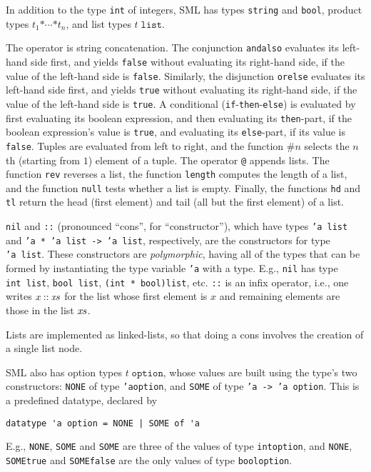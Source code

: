In addition to the type \texttt{int} of integers,
%
%
SML has types \texttt{string} and \texttt{bool}, product types
$t_1\mathbin{\mathtt{*}}\cdots\mathbin{\mathtt{*}}t_n$, and list types
$t\;\mathtt{list}$.  %
%
%
%
%
%
%

The operator \texttt{\uparrowsym} is string
concatenation.  The conjunction \texttt{andalso} evaluates its
left-hand side first, and yields \texttt{false} without evaluating its
right-hand side, if the value of the left-hand side is \texttt{false}.
Similarly, the disjunction \texttt{orelse} evaluates its left-hand
side first, and yields \texttt{true} without evaluating its right-hand
side, if the value of the left-hand side is \texttt{true}.  A
conditional (\texttt{if}-\texttt{then}-\texttt{else}) is evaluated by
first evaluating its boolean expression, and then evaluating its
\texttt{then}-part, if the boolean expression's value is
\texttt{true}, and evaluating its \texttt{else}-part, if its value is
\texttt{false}.  Tuples are evaluated from left to right, and the
function $\texttt{\#}n$ selects the $n$th (starting from $1$) element
of a tuple. The operator \texttt{@} appends lists.   The function
\texttt{rev} reverses a list, the function \texttt{length} computes
the length of a list, and the function \texttt{null} tests
whether a list is empty.  Finally, the functions \texttt{hd} and
\texttt{tl} return the head (first element) and tail (all but the
first element) of a list.

\texttt{nil} and \texttt{::} (pronounced ``cons'', for
``constructor''), which have types \texttt{'a~list} and
\texttt{'a~*~'a~list~->~'a~list}, respectively, are the constructors
for type \texttt{'a~list}.
These constructors are \emph{polymorphic}, having all of the types
that can be formed by instantiating the type variable \texttt{'a} with
a type.  E.g., \texttt{nil} has type \texttt{int~list}, \texttt{bool~list},
\texttt{(int~*~bool)list}, etc.  \texttt{::} is an infix operator,
i.e., one writes $x\mathbin{\mathtt{::}}{\it xs}$ for the list whose
first element is $x$ and remaining elements are those in the list
${\it xs}$.

Lists are implemented as linked-lists, so that doing a cons involves
the creation of a single list node.

SML also has option types $t\;\mathtt{option}$, whose values are
%
built using the type's two constructors: \texttt{NONE}
%
of type \texttt{'a\;option}, and \texttt{SOME}
%
of type \texttt{'a~->~'a~option}.  This is a predefined
datatype, declared by
\begin{verbatim}
datatype 'a option = NONE | SOME of 'a
\end{verbatim}
E.g., \texttt{NONE}, \texttt{SOME} and
\texttt{SOME\;} are three of the values of type
\texttt{int\;option}, and \texttt{NONE}, \texttt{SOME\;true} and
\texttt{SOME\;false} are the only values of type
\texttt{bool\;option}.


